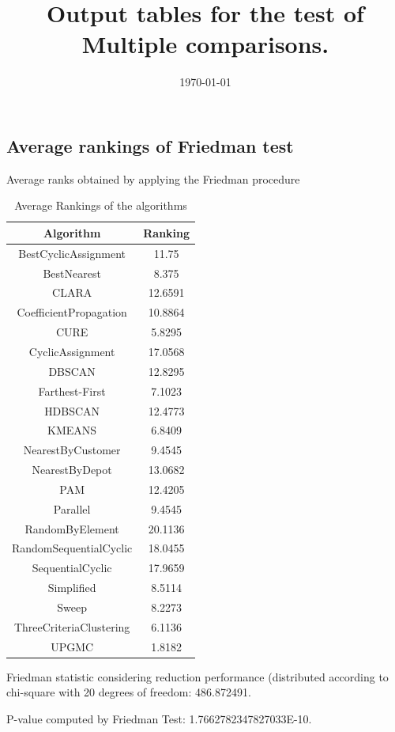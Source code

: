 \documentclass[a4paper,10pt]{article}
\title{Output tables for the test of Multiple comparisons.}
\author{}
\date{\today}
\begin{document}
\begin{landscape}
\pagestyle{empty}
\maketitle
\thispagestyle{empty}
\section{Average rankings of Friedman test}



Average ranks obtained by applying the Friedman procedure

\begin{table}[!htp]
\centering
\begin{tabular}{|c|c|}\hline
Algorithm&Ranking\\\hline
BestCyclicAssignment & 11.75\\
BestNearest & 8.375\\
CLARA & 12.6591\\
CoefficientPropagation & 10.8864\\
CURE & 5.8295\\
CyclicAssignment & 17.0568\\
DBSCAN & 12.8295\\
Farthest-First & 7.1023\\
HDBSCAN & 12.4773\\
KMEANS & 6.8409\\
NearestByCustomer & 9.4545\\
NearestByDepot & 13.0682\\
PAM & 12.4205\\
Parallel & 9.4545\\
RandomByElement & 20.1136\\
RandomSequentialCyclic & 18.0455\\
SequentialCyclic & 17.9659\\
Simplified & 8.5114\\
Sweep & 8.2273\\
ThreeCriteriaClustering & 6.1136\\
UPGMC & 1.8182\\
\hline
\end{tabular}
\caption{Average Rankings of the algorithms}
\end{table}

Friedman statistic considering reduction performance (distributed according to chi-square with 20 degrees of freedom: 486.872491.

P-value computed by Friedman Test: 1.7662782347827033E-10.\newline


\end{landscape}
\end{document}

